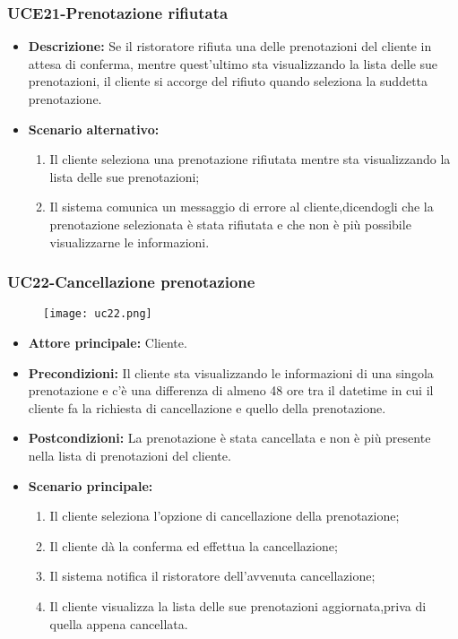 \subsubsection{UCE21-Prenotazione rifiutata}
\begin{itemize}
    \item \textbf{Descrizione: }Se il ristoratore rifiuta una delle prenotazioni del cliente in attesa di conferma,
    mentre quest'ultimo sta visualizzando la lista delle sue prenotazioni, il cliente si accorge del rifiuto quando
    seleziona la suddetta prenotazione.
    \item \textbf{Scenario alternativo: }
    \begin{enumerate}
        \item Il cliente seleziona una prenotazione rifiutata mentre sta visualizzando la lista
        delle sue prenotazioni;
        \item Il sistema comunica un messaggio di errore al cliente,dicendogli che la prenotazione selezionata
        è stata rifiutata e che non è più possibile visualizzarne le informazioni.
    \end{enumerate}
\end{itemize}

\subsubsection{UC22-Cancellazione prenotazione}
\begin{figure}[h] \texttt{[image: uc22.png]} \end{figure}
\begin{itemize}
    \item \textbf{Attore principale: } Cliente.
    \item \textbf{Precondizioni: }Il cliente sta visualizzando le informazioni di una singola prenotazione
    e c'è una differenza di almeno 48 ore tra il datetime in cui il cliente fa la richiesta di cancellazione e quello della prenotazione.
    \item \textbf{Postcondizioni: }La prenotazione è stata cancellata e non è più presente nella lista di prenotazioni
    del cliente.
    \item \textbf{Scenario principale:}
        \begin{enumerate}
            \item Il cliente seleziona l'opzione di cancellazione della prenotazione;
            \item Il cliente dà la conferma ed effettua la cancellazione;
            \item Il sistema notifica il ristoratore dell'avvenuta cancellazione;
            \item Il cliente visualizza la lista delle sue prenotazioni aggiornata,priva di quella appena
            cancellata.
        \end{enumerate}
\end{itemize}

